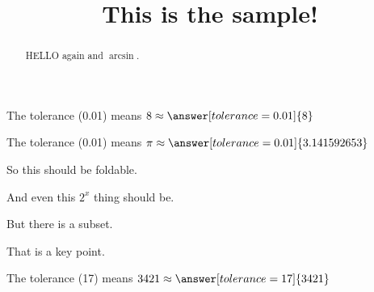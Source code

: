 \documentclass{ximera}
\title{This is the sample!}
\begin{document}
\begin{abstract}
HELLO again and $\arcsin$.
\end{abstract}

\maketitle


 \begin{problem}
   The tolerance (0.01) means $8 \approx \answer[tolerance=0.01]{8}$
 \end{problem}

 \begin{problem}
   The tolerance (0.01) means $\pi \approx \answer[tolerance=0.01]{3.141592653}$
 \end{problem}


\begin{foldable}
  So this should be foldable.

  And even this $2^x$ thing should be.
  
  \begin{foldable}
  But there is a subset.  
  \end{foldable}

    That is a key point.  

 \begin{problem}
   The tolerance (17) means $3421 \approx \answer[tolerance=17]{3421}$
 \end{problem}

\end{foldable}




  
\end{document}
